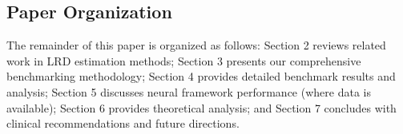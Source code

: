 \subsection{Paper Organization}

The remainder of this paper is organized as follows: Section 2 reviews related work in LRD estimation methods; Section 3 presents our comprehensive benchmarking methodology; Section 4 provides detailed benchmark results and analysis; Section 5 discusses neural framework performance (where data is available); Section 6 provides theoretical analysis; and Section 7 concludes with clinical recommendations and future directions.
